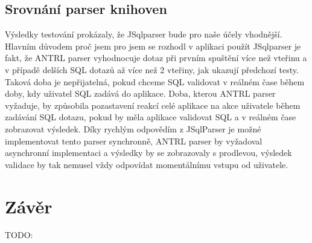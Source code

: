 \documentclass[czech,bachelor,public,dept460,male,cpdeclaration,twoside]{diploma}
\begin{document}
\subsection{Srovnání parser knihoven}
Výsledky testování prokázaly, že JSqlparser bude pro naše účely vhodnější. Hlavním důvodem proč jsem pro jsem se rozhodl v aplikaci použít JSqlparser je fakt, že ANTRL parser vyhodnocuje dotaz při prvním spuštění více než vteřinu a v případě delších SQL dotazů až více než 2 vteřiny, jak ukazují předchozí testy. Taková doba je nepřijatelná, pokud chceme SQL validovat v reálném čase během doby, kdy uživatel SQL zadává do aplikace. Doba, kterou ANTRL parser vyžaduje, by způsobila pozastavení reakcí celé aplikace na akce uživatele během zadávání SQL dotazu, pokud by měla aplikace validovat SQL a v reálném čase zobrazovat výsledek. Díky rychlým odpovědím z JSqlParser je možné implementovat tento parser synchronně, ANTRL parser by vyžadoval asynchronní implementaci a výsledky by se zobrazovaly s prodlevou, výsledek validace by tak nemusel vždy odpovídat momentálnímu vstupu od uživatele.


































\section{Závěr}
TODO:
\end{document}

